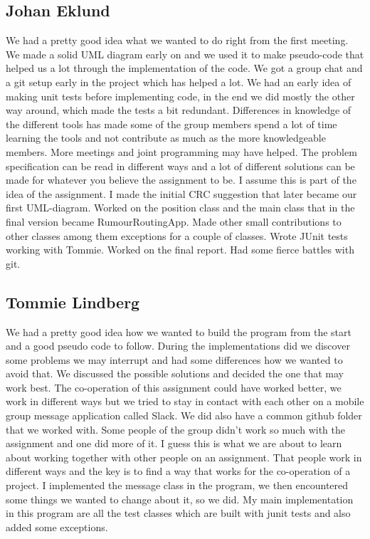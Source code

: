 \documentclass[a4paper,11pt,twoside]{article}
\begin{document}
\subsection{Johan Eklund}
We had a pretty good idea what we wanted to do right from the first
meeting. We made a solid UML diagram early on and we used it to make
pseudo-code that helped us a lot through the implementation of the
code.
We got a group chat and a git setup early in the project which has
helped a lot.
We had an early idea of making unit tests before implementing code, in
the end we did mostly the other way around, which made the tests a bit
redundant.
Differences in knowledge of the different tools has made some of the
group members spend a lot of time learning the tools and not
contribute as much as the more knowledgeable members. More meetings
and joint programming may have helped.
The problem specification can be read in different ways and a lot of
different solutions can be made for whatever you believe the
assignment to be. I assume this is part of the idea of the assignment.
I made the initial CRC suggestion that later became our first
UML-diagram. Worked on the position class and the main class that in
the final version became RumourRoutingApp. Made other small
contributions to other classes among them exceptions for a couple of
classes. Wrote JUnit tests working with Tommie. Worked on the final
report. Had some fierce battles with git.

\subsection{Tommie Lindberg}
We had a pretty good idea how we wanted to build the program from the
start and a good pseudo code to follow. During the implementations did
we discover some problems we may interrupt and had some differences how
we wanted to avoid that. We discussed the possible solutions and
decided the one that may work best. 
The co-operation of this assignment could have worked better, we work
in different ways but we tried to stay in contact with each other on a
mobile group message application called Slack. We did also have a
common github folder that we worked with. Some people of the group
didn't work so much with the assignment and one did more of it. I
guess this is what we are about to learn about working together with
other people on an assignment. That people work in different ways and
the key is to find a way that works for the co-operation of a project.
I implemented the message class in the program, we then encountered
some things we wanted to change about it, so we did. My main
implementation in this program are all the test classes which are
built with junit tests and also added some exceptions.
\end{document}
